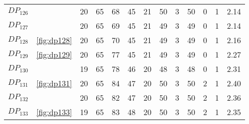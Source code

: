 \documentclass{article}
\begin{document}
\begin{center}
\begin{tabular}{llrrrrrrrrrrr}
$DP_{126}$ &  & 20 & 65 & 68 & 45 & 21 & 50 & 3 & 50 & 0 & 1 & 2.14 \\
$DP_{127}$ &  & 20 & 65 & 69 & 45 & 21 & 49 & 3 & 49 & 0 & 1 & 2.14 \\
$DP_{128}$ & \ref{fig:dp128} & 20 & 65 & 70 & 45 & 21 & 49 & 3 & 49 & 0 & 1 & 2.16 \\
$DP_{129}$ & \ref{fig:dp129} & 20 & 65 & 77 & 45 & 21 & 49 & 3 & 49 & 0 & 1 & 2.27 \\
$DP_{130}$ &  & 19 & 65 & 78 & 46 & 20 & 48 & 3 & 48 & 0 & 1 & 2.31 \\
$DP_{131}$ & \ref{fig:dp131} & 20 & 65 & 84 & 47 & 20 & 50 & 3 & 50 & 2 & 1 & 2.40 \\
$DP_{132}$ &  & 20 & 65 & 82 & 47 & 20 & 50 & 3 & 50 & 2 & 1 & 2.36 \\
$DP_{133}$ & \ref{fig:dp133} & 19 & 65 & 83 & 48 & 20 & 50 & 3 & 50 & 2 & 1 & 2.35 \\
\bottomrule
\end{tabular}

\end{center}
\end{document}
